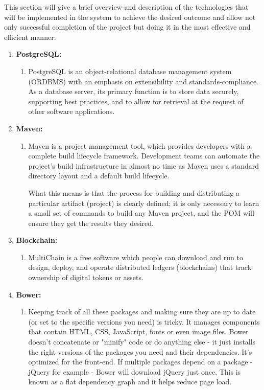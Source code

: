 This section will give a brief overview and description of the technologies that will be implemented in the system to achieve the desired outcome and allow not only successful completion of the project but doing it in the most effective and efficient manner.

	\begin{enumerate}		
		\item \textbf{PostgreSQL:}
		\begin{enumerate}
			\item[] PostgreSQL is an object-relational database management system (ORDBMS) with an emphasis on extensibility and standards-compliance. As a database server, its primary function is to store data securely, supporting best practices, and to allow for retrieval at the request of other software applications. 
		\end{enumerate} 
		
		\item \textbf{Maven:}
		\begin{enumerate}
			\item[] Maven is a project management tool, which provides developers with a complete build lifecycle framework. Development teams can automate the project's build infrastructure in almost no time as Maven uses a standard directory layout and a default build lifecycle.
						
			What this means is that the process for building and distributing a particular artifact (project) is clearly defined; it is only necessary to learn a small set of commands to build any Maven project, and the POM will ensure they get the results they desired.
		\end{enumerate}
		
		\newpage
		
		\item \textbf{Blockchain:}	
		\begin{enumerate}
			\item[] MultiChain is a free software which people can download and run to design, deploy, and operate distributed ledgers (blockchains) that track ownership of digital tokens or assets.
		\end{enumerate}
		
		\item \textbf{Bower:}	
		\begin{enumerate}
			\item[] Keeping track of all these packages and making sure they are up to date (or set to the specific versions you need) is tricky. It manages components that contain HTML, CSS, JavaScript, fonts or even image files. Bower doesn’t concatenate or "minify" code or do anything else - it just installs the right versions of the packages you need and their dependencies. It's optimized for the front-end. If multiple packages depend on a package - jQuery for example - Bower will download jQuery just once. This is known as a flat dependency graph and it helps reduce page load.
		\end{enumerate}
		

\end{enumerate}
